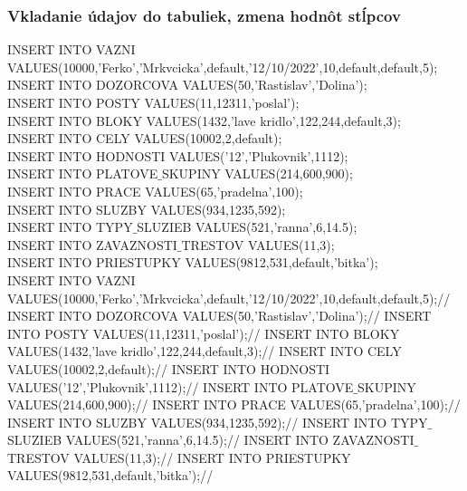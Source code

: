 \documentclass[slovak, 12pt, Times New Roman]{article}
\begin{document}
			\subsubsection{Vkladanie údajov do tabuliek, zmena hodnôt stĺpcov}
				INSERT INTO VAZNI VALUES(10000,'Ferko','Mrkvcicka',default,'12/10/2022',10,default,default,5);\\
				INSERT INTO DOZORCOVA VALUES(50,'Rastislav','Dolina');\\
				INSERT INTO POSTY VALUES(11,12311,'poslal');\\
				INSERT INTO BLOKY VALUES(1432,'lave kridlo',122,244,default,3);\\
				INSERT INTO CELY VALUES(10002,2,default);\\
				INSERT INTO HODNOSTI VALUES('12','Plukovnik',1112);\\
				INSERT INTO PLATOVE$\_$SKUPINY VALUES(214,600,900);\\
				INSERT INTO PRACE VALUES(65,'pradelna',100);\\
				INSERT INTO SLUZBY VALUES(934,1235,592);\\
				INSERT INTO TYPY$\_$SLUZIEB VALUES(521,'ranna',6,14.5);\\
				INSERT INTO ZAVAZNOSTI$\_$TRESTOV VALUES(11,3);\\
				INSERT INTO PRIESTUPKY VALUES(9812,531,default,'bitka');\\
				INSERT INTO VAZNI VALUES(10000,'Ferko','Mrkvcicka',default,'12/10/2022',10,default,default,5);//
				INSERT INTO DOZORCOVA VALUES(50,'Rastislav','Dolina');//
				INSERT INTO POSTY VALUES(11,12311,'poslal');//
				INSERT INTO BLOKY VALUES(1432,'lave kridlo',122,244,default,3);//
				INSERT INTO CELY VALUES(10002,2,default);//
				INSERT INTO HODNOSTI VALUES('12','Plukovnik',1112);//
				INSERT INTO PLATOVE$\_$SKUPINY VALUES(214,600,900);//
				INSERT INTO PRACE VALUES(65,'pradelna',100);//
				INSERT INTO SLUZBY VALUES(934,1235,592);//
				INSERT INTO TYPY$\_$SLUZIEB VALUES(521,'ranna',6,14.5);//
				INSERT INTO ZAVAZNOSTI$\_$TRESTOV VALUES(11,3);//
				INSERT INTO PRIESTUPKY VALUES(9812,531,default,'bitka');//
			\clearpage
\end{document}
